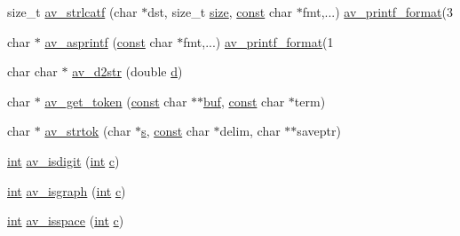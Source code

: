 \begin{DoxyCompactItemize}
size\+\_\+t \hyperlink{group__lavu__string_gae264e2caf6ad1ca830ce3f2b49abdf50}{av\+\_\+strlcatf} (char $\ast$dst, size\+\_\+t \hyperlink{group__lavu__mem_ga854352f53b148adc24983a58a1866d66}{size}, \hyperlink{getopt1_8c_a2c212835823e3c54a8ab6d95c652660e}{const} char $\ast$fmt,...) \hyperlink{attributes_8h_a4b078d4b8e02c0f452ee1dcaa7d983d3}{av\+\_\+printf\+\_\+format}(3
\item 
char $\ast$ \hyperlink{group__lavu__string_ga0a8e3f4a2a3039c441bd0826e4727462}{av\+\_\+asprintf} (\hyperlink{getopt1_8c_a2c212835823e3c54a8ab6d95c652660e}{const} char $\ast$fmt,...) \hyperlink{attributes_8h_a4b078d4b8e02c0f452ee1dcaa7d983d3}{av\+\_\+printf\+\_\+format}(1
\item 
char char $\ast$ \hyperlink{group__lavu__string_ga45d0395a448bc186baf081933ea816c9}{av\+\_\+d2str} (double \hyperlink{poly-fir_8h_a2530554172d8629149ec56816eeaa947}{d})
\item 
char $\ast$ \hyperlink{group__lavu__string_ga7b438169b430f6edf4f4451d867a9218}{av\+\_\+get\+\_\+token} (\hyperlink{getopt1_8c_a2c212835823e3c54a8ab6d95c652660e}{const} char $\ast$$\ast$\hyperlink{xlstr_8c_a781718f5b53a876fe91c424c4607fa8f}{buf}, \hyperlink{getopt1_8c_a2c212835823e3c54a8ab6d95c652660e}{const} char $\ast$term)
\item 
char $\ast$ \hyperlink{group__lavu__string_ga3d4270f4ed651c414e2850090b9b77c4}{av\+\_\+strtok} (char $\ast$\hyperlink{lib_2expat_8h_a755339d27872b13735c2cab829e47157}{s}, \hyperlink{getopt1_8c_a2c212835823e3c54a8ab6d95c652660e}{const} char $\ast$delim, char $\ast$$\ast$saveptr)
\item 
\hyperlink{xmltok_8h_a5a0d4a5641ce434f1d23533f2b2e6653}{int} \hyperlink{group__lavu__string_ga99c146fb2512c81128de3787e8c5df82}{av\+\_\+isdigit} (\hyperlink{xmltok_8h_a5a0d4a5641ce434f1d23533f2b2e6653}{int} \hyperlink{rfft2d_test_m_l_8m_ae0323a9039add2978bf5b49550572c7c}{c})
\item 
\hyperlink{xmltok_8h_a5a0d4a5641ce434f1d23533f2b2e6653}{int} \hyperlink{group__lavu__string_gaef38d29ca3e476219b2d0d90b99522da}{av\+\_\+isgraph} (\hyperlink{xmltok_8h_a5a0d4a5641ce434f1d23533f2b2e6653}{int} \hyperlink{rfft2d_test_m_l_8m_ae0323a9039add2978bf5b49550572c7c}{c})
\item 
\hyperlink{xmltok_8h_a5a0d4a5641ce434f1d23533f2b2e6653}{int} \hyperlink{group__lavu__string_gabaff995bffa1668b17a9dbcde8ec7fdc}{av\+\_\+isspace} (\hyperlink{xmltok_8h_a5a0d4a5641ce434f1d23533f2b2e6653}{int} \hyperlink{rfft2d_test_m_l_8m_ae0323a9039add2978bf5b49550572c7c}{c})
\item 

\end{DoxyCompactItemize}
